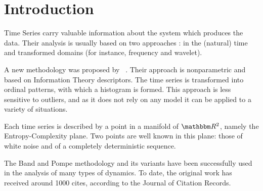 \documentclass[sts]{imsart}
\begin{document}
\section{Introduction}\label{Sec:Intro}

Time Series carry valuable information about the system which produces the data.
Their analysis is usually based on two approaches \cite{TimeSeriesAnalysisCryerChan}: in the (natural) time and transformed domains (for instance, frequency and wavelet).

A new methodology was proposed by \citeauthor{PermutationEntropyBandtPompe}~.
Their approach is nonparametric and based on Information Theory descriptors.
The time series is transformed into ordinal patterns, with which a histogram is formed.
This approach is less sensitive to outliers, and as it does not rely on any model it can be applied to a variety of situations.

Each time series is described by a point in a manifold of $\mathbbm R^2$, namely the Entropy-Complexity plane.
Two points are well known in this plane: those of white noise and of a completely deterministic sequence.

The Band and Pompe methodology and its variants have been successfully used in the analysis of many types of dynamics.
To date, the original work has received around \num{1000} cites, according to the Journal of Citation Records.
\end{document}
